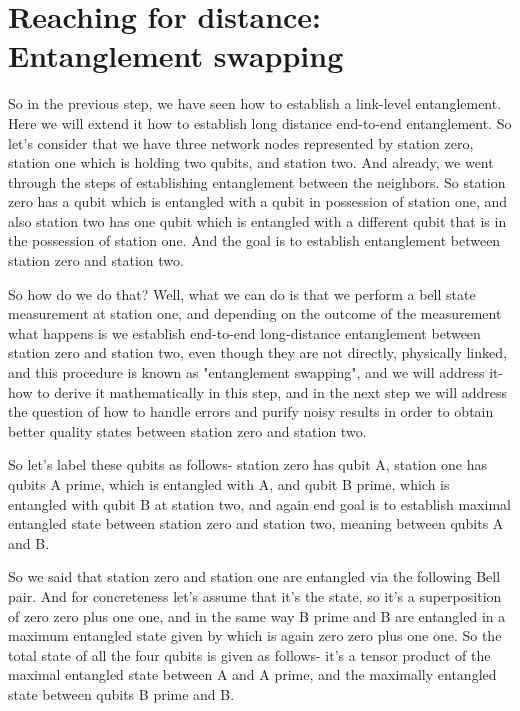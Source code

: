 \section{Reaching for distance: Entanglement swapping}


So in the previous step, we have seen how to establish a link-level entanglement. Here we will extend it how to establish long distance end-to-end entanglement. So let's consider that we have three network nodes represented by station zero, station one which is holding two qubits, and station two. And already, we went through the steps of establishing entanglement between the neighbors. So station zero has a qubit which is entangled with a qubit in possession of station one, and also station two has one qubit which is entangled with a different qubit that is in the possession of station one. And the goal is to establish entanglement between station zero and station two.

So how do we do that? Well, what we can do is that we perform a bell state measurement at station one, and depending on the outcome of the measurement what happens is we establish end-to-end long-distance entanglement between station zero and station two, even though they are not directly, physically linked, and this procedure is known as "entanglement swapping", and we will address it- how to derive it mathematically in this step, and in the next step we will address the question of how to handle errors and purify noisy results in order to obtain better quality states between station zero and station two.

So let's label these qubits as follows- station zero has qubit A, station one has qubits A prime, which is entangled with A, and qubit B prime, which is entangled with qubit B at station two, and again end goal is to establish maximal entangled state between station zero and station two, meaning between qubits A and B.

So we said that station zero and station one are entangled via the following Bell pair. And for concreteness let's assume that it's the  \ket{\Phi^+} state, so it's a superposition of zero zero plus one one, and in the same way B prime and B are entangled in a maximum entangled state given by  \ket{\Phi^+} which is again zero zero plus one one. So the total state of all the four qubits is given as follows- it's a tensor product of the maximal entangled state  \ket{\Phi^+} between A and A prime, and the maximally entangled state  \ket{\Phi^+} between qubits B prime and B.


